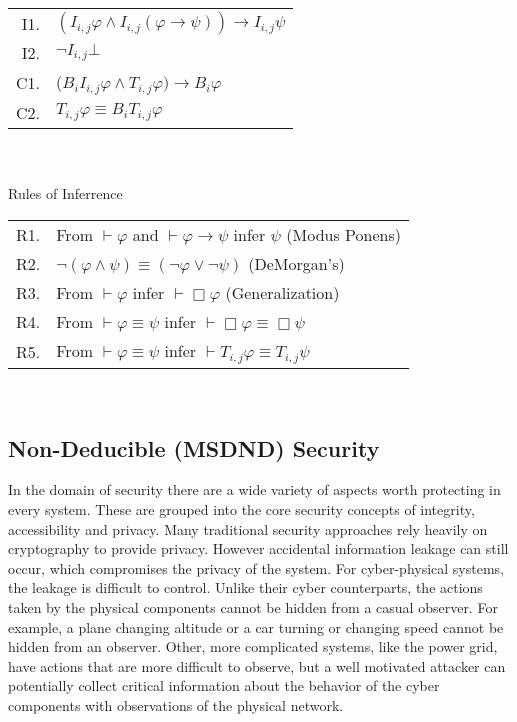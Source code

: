 \begin{table}[!t]
\begin{tabular}{r l}
I1. & $(I_{i,j} \varphi \wedge I_{i,j} (\varphi \rightarrow \psi )) \rightarrow I_{i,j} \psi$\\
I2. & $\neg I_{i,j} \bot$ \\
C1. & ($B_i I_{i,j} \varphi \wedge T_{i,j} \varphi) \rightarrow B_i \varphi$ \\
C2. & $T_{i,j} \varphi \equiv B_i T_{i,j} \varphi$ \\
\end{tabular} \\~\\
Rules of Inferrence \\
\begin{tabular}{r l}
R1. & From $\vdash \varphi$ and $\vdash \varphi \rightarrow \psi$ infer $\psi$ (Modus Ponens) \\
R2. & $\neg (\varphi \wedge \psi) \equiv (\neg \varphi \vee \neg \psi)$ (DeMorgan's)\\
R3. & From $\vdash \varphi$ infer $\vdash \Box \varphi$ (Generalization)\\
R4. & From $\vdash \varphi \equiv \psi$ infer $\vdash \Box \varphi \equiv \Box \psi$\\
R5. & From $\vdash \varphi \equiv \psi$ infer $\vdash T_{i,j} \varphi \equiv T_{i,j} \psi$\\
\end{tabular} \\
\label{tab:axiomatic}
\end{table}

\subsection{Non-Deducible (MSDND) Security}

In the domain of security there are a wide variety of aspects worth protecting in every system. These are grouped into the core security concepts of integrity, accessibility and privacy. Many traditional security approaches rely heavily on cryptography to provide privacy. However accidental information leakage can still occur, which compromises the privacy of the system. For cyber-physical systems, the leakage is difficult to control. Unlike their cyber counterparts, the actions taken by the physical components cannot be hidden from a casual observer. For example, a plane changing altitude or a car turning or changing speed cannot be hidden from an observer. Other, more complicated systems, like the power grid, have actions that are more difficult to observe, but a well motivated attacker can potentially collect critical information about the behavior of the cyber components with observations of the physical network\cite{Roth2012}.

